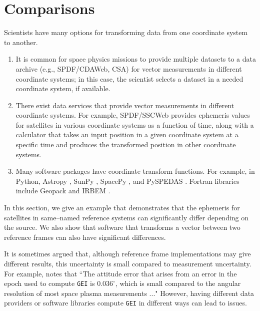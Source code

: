\documentclass[draft]{agujournal2019}
\begin{document}

\section{Comparisons}
\label{sect:comparisons}

Scientists have many options for transforming data from one coordinate system to another.

\begin{enumerate}

    \parskip 0.1in 

    \item It is common for space physics missions to provide multiple datasets to a data archive (e.g., SPDF/CDAWeb, CSA) for vector measurements in different coordinate systems; in this case, the scientist selects a dataset in a needed coordinate system, if available.

    \item There exist data services that provide vector measurements in different coordinate systems. For example, SPDF/SSCWeb provides ephemeris values for satellites in various coordinate systems as a function of time, along with a calculator that takes an input position in a given coordinate system at a specific time and produces the transformed position in other coordinate systems. 

    \item Many software packages have coordinate transform functions. For example, in Python, Astropy \cite{AstroPy2022}, SunPy \cite{SunPy}, SpacePy \cite{SpacePy}, and PySPEDAS \cite{Angelopoulos2024}. Fortran libraries include Geopack \cite{Tsyganenko2008} and IRBEM \cite{IRBEM2022}.

\end{enumerate}

In this section, we give an example that demonstrates that the ephemeris for satellites in same--named reference systems can significantly differ depending on the source. We also show that software that transforms a vector between two reference frames can also have significant differences.

It is sometimes argued that, although reference frame implementations may give different results, this uncertainty is small compared to measurement uncertainty. For example,  notes that ``The attitude error that arises from an error in the epoch used to compute \texttt{GEI} is $0.036^\circ$, which is small compared to the angular resolution of most space plasma measurements ..."
However, having different data providers or software libraries compute \texttt{GEI} in different ways can lead to issues. 
\end{document}
